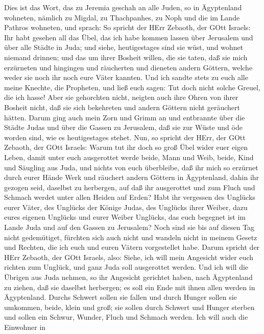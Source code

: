 Dies ist das Wort, das zu Jeremia geschah an alle Juden, so
in Ägyptenland wohneten, nämlich zu Migdal, zu Thachpanhes, zu Noph und
die im Lande Pathros wohneten, und sprach:  So spricht der
HErr Zebaoth, der GOtt Israels: Ihr habt gesehen all das Übel, das ich
habe kommen lassen über Jerusalem und über alle Städte in Juda; und
siehe, heutigestages sind sie wüst, und wohnet niemand drinnen;
 und das um ihrer Bosheit willen, die sie taten, daß sie
mich erzürneten und hingingen und räucherten und dieneten andern
Göttern, welche weder sie noch ihr noch eure Väter kannten. 
Und ich sandte stets zu euch alle meine Knechte, die Propheten, und ließ
euch sagen: Tut doch nicht solche Greuel, die ich hasse! 
Aber sie gehorchten nicht, neigten auch ihre Ohren von ihrer Bosheit
nicht, daß sie sich bekehreten und andern Göttern nicht geräuchert
hätten.  Darum ging auch mein Zorn und Grimm an und
entbrannte über die Städte Judas und über die Gassen zu Jerusalem, daß
sie zur Wüste und öde worden sind, wie es heutigestages stehet.
 Nun, so spricht der HErr, der GOtt Zebaoth, der GOtt
Israels: Warum tut ihr doch so groß Übel wider euer eigen Leben, damit
unter euch ausgerottet werde beide, Mann und Weib, beide, Kind und
Säugling aus Juda, und nichts von euch überbleibe,  daß ihr
mich so erzürnet durch eurer Hände Werk und räuchert andern Göttern in
Ägyptenland, dahin ihr gezogen seid, daselbst zu herbergen, auf daß ihr
ausgerottet und zum Fluch und Schmach werdet unter allen Heiden auf
Erden?  Habt ihr vergessen des Unglücks eurer Väter, des
Unglücks der Könige Judas, des Unglücks ihrer Weiber, dazu eures eigenen
Unglücks und eurer Weiber Unglücks, das euch begegnet ist im Lande Juda
und auf den Gassen zu Jerusalem?  Noch sind sie bis auf
diesen Tag nicht gedemütiget, fürchten sich auch nicht und wandeln nicht
in meinem Gesetz und Rechten, die ich euch und euren Vätern vorgestellet
habe.  Darum spricht der HErr Zebaoth, der GOtt Israels,
also: Siehe, ich will mein Angesicht wider euch richten zum Unglück, und
ganz Juda soll ausgerottet werden.  Und ich will die
Übrigen aus Juda nehmen, so ihr Angesicht gerichtet haben, nach
Ägyptenland zu ziehen, daß sie daselbst herbergen; es soll ein Ende mit
ihnen allen werden in Ägyptenland. Durchs Schwert sollen sie fallen und
durch Hunger sollen sie umkommen, beide, klein und groß; sie sollen
durch Schwert und Hunger sterben und sollen ein Schwur, Wunder, Fluch
und Schmach werden.  Ich will auch die Einwohner in
